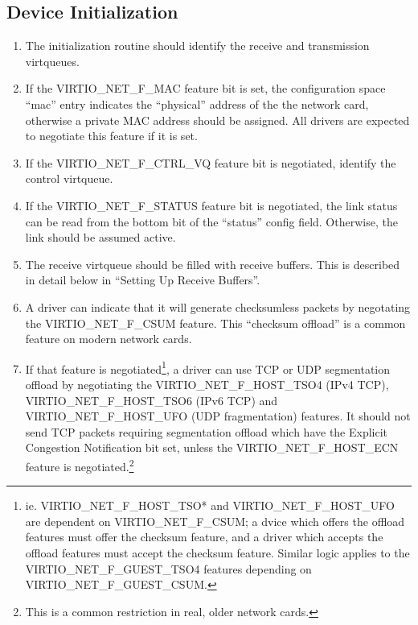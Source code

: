 \subsection{Device Initialization}\label{sec:Device Types / Network Device / Device Initialization}

\begin{enumerate}
\item The initialization routine should identify the receive and
  transmission virtqueues.

\item If the VIRTIO_NET_F_MAC feature bit is set, the configuration
  space “mac” entry indicates the “physical” address of the the
  network card, otherwise a private MAC address should be
  assigned. All drivers are expected to negotiate this feature if
  it is set.

\item If the VIRTIO_NET_F_CTRL_VQ feature bit is negotiated,
  identify the control virtqueue.

\item If the VIRTIO_NET_F_STATUS feature bit is negotiated, the link
  status can be read from the bottom bit of the “status” config
  field. Otherwise, the link should be assumed active.

\item The receive virtqueue should be filled with receive buffers.
  This is described in detail below in “Setting Up Receive
  Buffers”.

\item A driver can indicate that it will generate checksumless
  packets by negotating the VIRTIO_NET_F_CSUM feature. This 
  “checksum offload” is a common feature on modern network cards.

\item If that feature is negotiated\footnote{ie. VIRTIO_NET_F_HOST_TSO* and VIRTIO_NET_F_HOST_UFO are
dependent on VIRTIO_NET_F_CSUM; a dvice which offers the offload
features must offer the checksum feature, and a driver which
accepts the offload features must accept the checksum feature.
Similar logic applies to the VIRTIO_NET_F_GUEST_TSO4 features
depending on VIRTIO_NET_F_GUEST_CSUM.
}, a driver can use TCP or UDP
  segmentation offload by negotiating the VIRTIO_NET_F_HOST_TSO4 (IPv4
  TCP), VIRTIO_NET_F_HOST_TSO6 (IPv6 TCP) and VIRTIO_NET_F_HOST_UFO
  (UDP fragmentation) features. It should not send TCP packets
  requiring segmentation offload which have the Explicit Congestion
  Notification bit set, unless the VIRTIO_NET_F_HOST_ECN feature is
  negotiated.\footnote{This is a common restriction in real, older network cards.
}


\end{enumerate}
